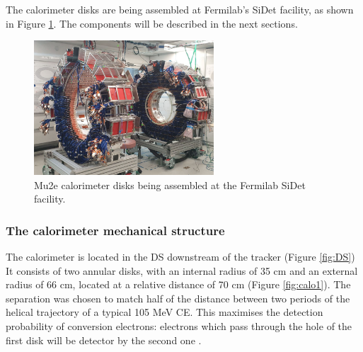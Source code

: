 The calorimeter disks are being assembled at Fermilab's SiDet facility, as shown in Figure 
\ref{fig:calostatus}. The components will be described in the next sections.

\begin{figure}[!h]
    \centering
    \includegraphics[width =0.6\textwidth]{figures/png/Screenshot_20240706_151533.png}
    \caption[The Mu2e calorimeter disks.]{Mu2e calorimeter disks being assembled at the Fermilab SiDet facility.}
    \label{fig:calostatus}
\end{figure}

\subsubsection{The calorimeter mechanical structure}
The calorimeter is located in the DS downstream of the tracker (Figure \ref{fig:DS})
It consists of two annular disks, with an internal radius of 35 cm and 
an external radius of 66 cm, located at a relative distance of 70 cm (Figure \ref{fig:calo1}).
The separation was chosen to match half of the distance between two periods of the helical trajectory 
of a typical 105 MeV CE. This maximises the detection probability of conversion 
electrons: electrons which pass through the hole of the first disk will be detector by the second one \cite{em7}. 


